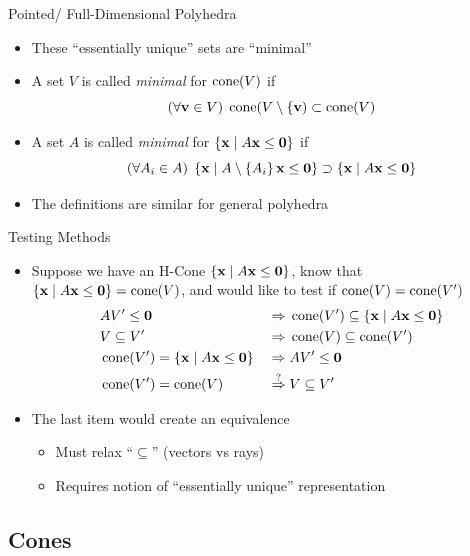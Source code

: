 \documentclass{beamer}
\begin{document}
\begin{frame}{Pointed/ Full-Dimensional Polyhedra}
\begin{itemize}
  \item<1-> These ``essentially unique'' sets are ``minimal''
  \item<2-> A set $V$ is called \textit{minimal} for $\operatorname{cone}(V)$ if
        \[ (\forall \mathbf{v}\in V)\; \operatorname{cone}(V\setminus\{\mathbf{v}) \subset \operatorname{cone}(V) \]
  \item<3-> A set $A$ is called \textit{minimal} for $\left\{\mathbf{x}\;|\; A\mathbf{x}\leq\mathbf{0}\right\}$ if
        \[ (\forall A_i \in A)\; \left\{\mathbf{x}\;|\; A\setminus\left\{A_i\right\}\mathbf{x}\leq\mathbf{0}\right\} \supset \left\{\mathbf{x}\;|\; A\mathbf{x}\leq\mathbf{0}\right\} \]
  \item<4-> The definitions are similar for general polyhedra
\end{itemize}
\end{frame}

\begin{frame}{Testing Methods}
\begin{itemize}
  \item<1-> Suppose we have an H-Cone $\left\{\mathbf{x}\;|\; A\mathbf{x}\leq\mathbf{0}\right\}$, know that $\left\{\mathbf{x}\;|\; A\mathbf{x}\leq\mathbf{0}\right\} = \operatorname{cone}(V)$, and would like to test if $\operatorname{cone}(V) = \operatorname{cone}(V')$
    \begin{alignat*}{2}
       & AV'\leq\mathbf{0} \;      & \Rightarrow & \; \operatorname{cone}(V') \subseteq \left\{\mathbf{x}\;|\; A\mathbf{x}\leq\mathbf{0}\right\}\\
       & V \subseteq V' \; & \Rightarrow & \; \operatorname{cone}(V) \subseteq \operatorname{cone}(V')\\
       & \operatorname{cone}(V') = \left\{\mathbf{x}\;|\; A\mathbf{x}\leq\mathbf{0}\right\} \;   & \Rightarrow & \; AV'\leq\mathbf{0} \\
       & \operatorname{cone}(V') = \operatorname{cone}(V)  \;& \overset{?}{\Rightarrow} & \; V \subseteq V'
    \end{alignat*}
  \item<2-> The last item would create an equivalence
  \begin{itemize}
    \item<3-> Must relax ``$\subseteq$'' (vectors vs rays)
    \item<4-> Requires notion of ``essentially unique'' representation
  \end{itemize}
\end{itemize}
\end{frame}

\subsection{Cones}
\end{document}
